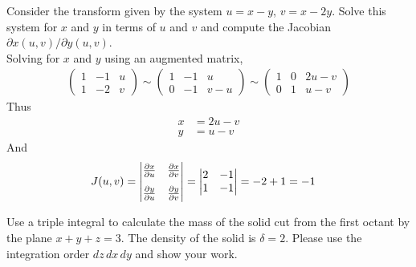 \ifnum {}
    \question[4]{} Consider the transform given by the system $u=x-y$, $v=x-2y$. Solve this system for $x$ and $y$ in terms of $u$ and $v$ and compute the Jacobian $\partial x(u,v)/\partial y(u,v)$.
    \ifnum {} \\[12pt]
    {\color{DarkBlue}
    Solving for $x$ and $y$ using an augmented matrix,
    \begin{align}
        \begin{pmatrix} 1 & -1 & u \\1 & -2 & v\end{pmatrix} 
        \sim \begin{pmatrix} 1 & -1 & u \\0 & -1 & v-u\end{pmatrix} 
        \sim \begin{pmatrix} 1 & 0 & 2u-v \\0 & 1 & u-v\end{pmatrix} 
    \end{align}
    Thus
    \begin{align}
        x &= 2u-v\\
        y &= u-v
    \end{align}
    And
    \begin{align}
        J(u,v) & = \begin{vmatrix} \frac{\partial x}{\partial u} & \frac{\partial x}{\partial v} \\[8pt] \frac{\partial y}{\partial u} & \frac{\partial y}{\partial v} \end{vmatrix} = \begin{vmatrix} 2 & -1 \\ 1 & -1 \end{vmatrix} = -2 +1 = -1
    \end{align}
    }
   \else

   \fi
\fi 



\ifnum {}
    \question[4] Use a triple integral to calculate the mass of the solid cut from the first octant by the plane $x+y+z=3$. The density of the solid is $\delta = 2$. Please use the integration order $dz\,dx\,dy$ and show your work. 
    

